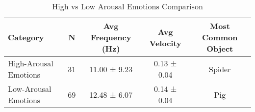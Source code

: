 \begin{table}[h]
\centering
\caption{High vs Low Arousal Emotions Comparison}
\begin{tabular}{lcccc}
\hline
Category & N & Avg Frequency (Hz) & Avg Velocity & Most Common Object \\
\hline
High-Arousal Emotions & 31 & 11.00 ± 9.23 & 0.13 ± 0.04 & Spider \\
Low-Arousal Emotions & 69 & 12.48 ± 6.07 & 0.14 ± 0.04 & Pig \\
\hline
\end{tabular}
\end{table}